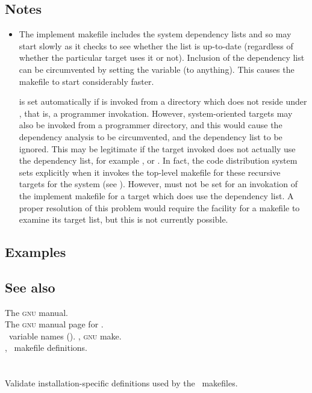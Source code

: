 \subsection*{Notes}

\begin{itemize}
\item
   The implement makefile includes the system dependency lists and so may
   start slowly as it checks to see whether the list is up-to-date (regardless
   of whether the particular target uses it or not).  Inclusion of the
   dependency list can be circumvented by setting the  variable
   (to anything).  This causes the makefile to start considerably faster.

    is set automatically if  is invoked from a
   directory which does not reside under , that is, a
   programmer invokation.  However, system-oriented targets may also be
   invoked from a programmer directory, and this would cause the dependency
   analysis to be circumvented, and the dependency list to be ignored.  This
   may be legitimate if the target invoked does not actually use the
   dependency list, for example ,  or
   .  In fact, the code distribution system sets 
   explicitly when it invokes the top-level makefile for these recursive
   targets for the system (see ).  However,  must
   not be set for an invokation of the implement makefile for a target which
   does use the dependency list.  A proper resolution of this problem would
   require the facility for a makefile to examine its target list, but this is
   not currently possible.
\end{itemize}

\subsection*{Examples}


\subsection*{See also}

The \textsc{gnu}  manual.\\
The \textsc{gnu} manual page for .\\
\aipspp\ variable names ().
, \textsc{gnu} make.\\
, \aipspp\ makefile definitions.\\

 
\newpage
\section{}
\label{testdefs}
 
Validate installation-specific definitions used by the \aipspp\ makefiles.
